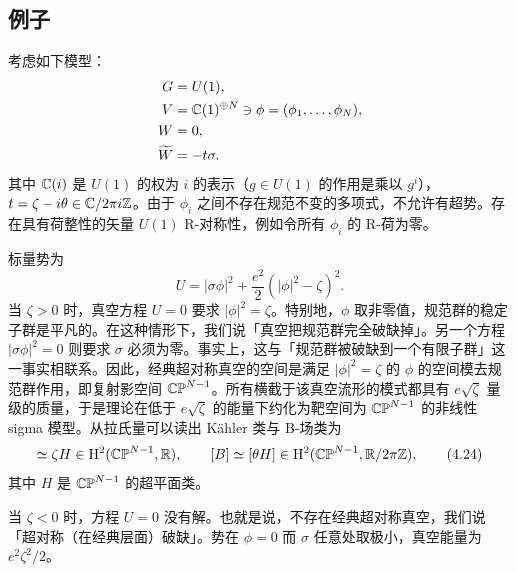 \subsection{例子}


考虑如下模型：
\begin{align*}
    G &= U(1),\\
    V &= \mathbb{C}(1)^{\oplus N}\ni\phi=(\phi_1,\ldots,\phi_N),\\
    W &= 0,\\
    \widetilde{W} &= -t\sigma.
\end{align*}
其中 $\mathbb{C}(i)$ 是 $U(1)$ 的权为 $i$ 的表示（$g\in U(1)$ 的作用是乘以 $g^i$），$t=\zeta-i\theta\in\mathbb{C}/2\pi i\mathbb{Z}$。由于 $\phi_i$ 之间不存在规范不变的多项式，不允许有超势。存在具有荷整性的矢量 $U(1)$ R-对称性，例如令所有 $\phi_i$ 的 R-荷为零。

标量势为
\begin{equation}
    U = |\sigma\phi|^2 + \frac{e^2}{2}\left(|\phi|^2-\zeta\right)^2. \tag{4.23}
\end{equation}
当 $\zeta>0$ 时，真空方程 $U=0$ 要求 $|\phi|^2=\zeta$。特别地，$\phi$ 取非零值，规范群的稳定子群是平凡的。在这种情形下，我们说「真空把规范群完全破缺掉」。另一个方程 $|\sigma\phi|^2=0$ 则要求 $\sigma$ 必须为零。事实上，这与「规范群被破缺到一个有限子群」这一事实相联系。因此，经典超对称真空的空间是满足 $|\phi|^2=\zeta$ 的 $\phi$ 的空间模去规范群作用，即复射影空间 $\mathbb{CP}^{N-1}$。所有横截于该真空流形的模式都具有 $e\sqrt{\zeta}$ 量级的质量，于是理论在低于 $e\sqrt{\zeta}$ 的能量下约化为靶空间为 $\mathbb{CP}^{N-1}$ 的非线性 sigma 模型。从拉氏量可以读出 Kähler 类与 B-场类为
\begin{equation}
    [\omega]\simeq\zeta H\in\mathrm{H}^2(\CP^{N-1},\R),\qquad
    [B]\simeq[\theta H]\in\mathrm{H}^2(\CP^{N-1},\R/2\pi\Z), \tag{4.24}
\end{equation}
其中 $H$ 是 $\mathbb{CP}^{N-1}$ 的超平面类。

当 $\zeta<0$ 时，方程 $U=0$ 没有解。也就是说，不存在经典超对称真空，我们说「超对称（在经典层面）破缺」。势在 $\phi=0$ 而 $\sigma$ 任意处取极小，真空能量为 $e^2\zeta^2/2$。


